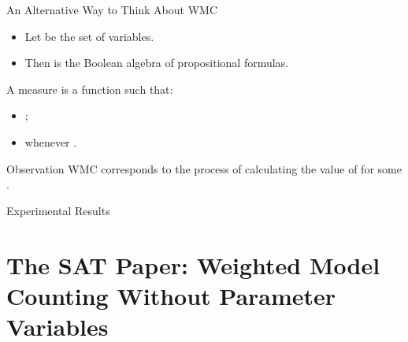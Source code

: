 \documentclass{beamer}
\begin{document}
\begin{frame}{An Alternative Way to Think About WMC}
  \begin{itemize}
  \item Let  be the set of variables.
  \item Then  is the Boolean algebra of propositional
    formulas.
  \end{itemize}
  \begin{definition}
    A \alert{measure} is a function  such that:
    \begin{itemize}
    \item {};
    \item {} whenever .
    \end{itemize}
  \end{definition}
  \begin{block}{Observation}
    WMC corresponds to the process of calculating the value of
     for some .
  \end{block}
\end{frame}


\begin{frame}{Experimental Results}
  \centering
  
\end{frame}

\section{The SAT Paper: Weighted Model Counting Without Parameter Variables}
\end{document}
